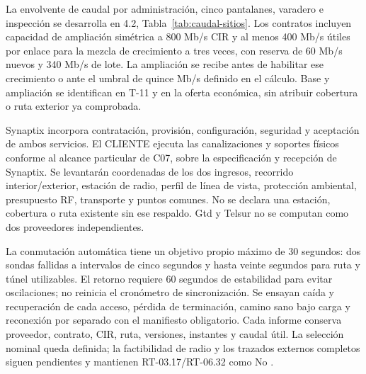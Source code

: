 La envolvente de caudal por administración, cinco pantalanes, varadero e inspección se desarrolla en 4.2, Tabla~\ref{tab:caudal-sitios}. Los contratos incluyen capacidad de ampliación simétrica a 800 Mb/s CIR y al menos 400 Mb/s útiles por enlace para la mezcla de crecimiento a tres veces, con reserva de 60 Mb/s nuevos y 340 Mb/s de lote. La ampliación se recibe antes de habilitar ese crecimiento o ante el umbral de quince Mb/s definido en el cálculo. Base y ampliación se identifican en T-11 y en la oferta económica, sin atribuir cobertura o ruta exterior ya comprobada.

Synaptix incorpora contratación, provisión, configuración, seguridad y aceptación de ambos servicios. El CLIENTE ejecuta las canalizaciones y soportes físicos conforme al alcance particular de C07, sobre la especificación y recepción de Synaptix. Se levantarán coordenadas de los dos ingresos, recorrido interior/exterior, estación de radio, perfil de línea de vista, protección ambiental, presupuesto RF, transporte y puntos comunes. No se declara una estación, cobertura o ruta existente sin ese respaldo. Gtd y Telsur no se computan como dos proveedores independientes.

La conmutación automática tiene un objetivo propio máximo de 30 segundos: dos sondas fallidas a intervalos de cinco segundos y hasta veinte segundos para ruta y túnel utilizables. El retorno requiere 60 segundos de estabilidad para evitar oscilaciones; no reinicia el cronómetro de sincronización. Se ensayan caída y recuperación de cada acceso, pérdida de terminación, camino sano bajo carga y reconexión por separado con el manifiesto obligatorio. Cada informe conserva proveedor, contrato, CIR, ruta, versiones, instantes y caudal útil. La selección nominal queda definida; la factibilidad de radio y los trazados externos completos siguen pendientes y mantienen RT-03.17/RT-06.32 como No \parencites[RT-03.17/20, p.~9; RT-06.32/33, p.~17]{pucv-transversal}[cap.~11]{caso07}.
